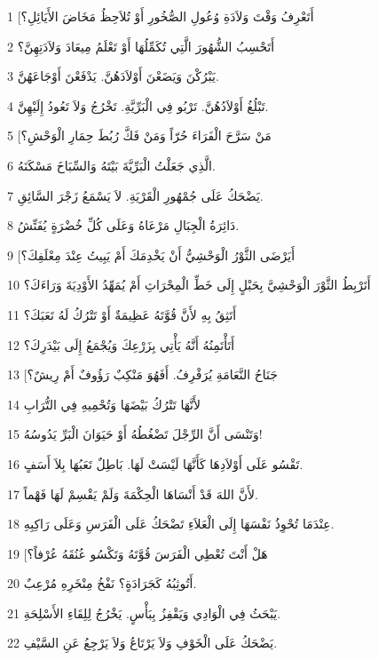 \par 1 [أَتَعْرِفُ وَقْتَ وَلاَدَةِ وُعُولِ الصُّخُورِ أَوْ تُلاَحِظُ مَخَاضَ الأَيَائِلِ؟
\par 2 أَتَحْسِبُ الشُّهُورَ الَّتِي تُكَمِّلُهَا أَوْ تَعْلَمُ مِيعَادَ وَلاَدَتِهِنَّ؟
\par 3 يَبْرُكْنَ وَيَضَعْنَ أَوْلاَدَهُنَّ. يَدْفَعْنَ أَوْجَاعَهُنَّ.
\par 4 تَبْلُغُ أَوْلاَدُهُنَّ. تَرْبُو فِي الْبَرِّيَّةِ. تَخْرُجُ وَلاَ تَعُودُ إِلَيْهِنَّ.
\par 5 [مَنْ سَرَّحَ الْفَرَاءَ حُرّاً وَمَنْ فَكَّ رُبُطَ حِمَارِ الْوَحْشِ؟
\par 6 الَّذِي جَعَلْتُ الْبَرِّيَّةَ بَيْتَهُ وَالسِّبَاخَ مَسْكَنَهُ.
\par 7 يَضْحَكُ عَلَى جُمْهُورِ الْقَرْيَةِ. لاَ يَسْمَعُ زَجْرَ السَّائِقِ.
\par 8 دَائِرَةُ الْجِبَالِ مَرْعَاهُ وَعَلَى كُلِّ خُضْرَةٍ يُفَتِّشُ.
\par 9 [أَيَرْضَى الثَّوْرُ الْوَحْشِيُّ أَنْ يَخْدِمَكَ أَمْ يَبِيتُ عِنْدَ مِعْلَفِكَ؟
\par 10 أَتَرْبِطُ الثَّوْرَ الْوَحْشِيَّ بِحَبْلٍ إِلَى خَطِّ الْمِحْرَاثِ أَمْ يُمَهِّدُ الأَوْدِيَةَ وَرَاءَكَ؟
\par 11 أَتَثِقُ بِهِ لأَنَّ قُوَّتَهُ عَظِيمَةٌ أَوْ تَتْرُكُ لَهُ تَعَبَكَ؟
\par 12 أَتَأْتَمِنُهُ أَنَّهُ يَأْتِي بِزَرْعِكَ وَيُجْمَعُ إِلَى بَيْدَرِكَ؟
\par 13 [جَنَاحُ النَّعَامَةِ يُرَفْرِفُ. أَفَهُوَ مَنْكِبٌ رَؤُوفٌ أَمْ رِيشٌ؟
\par 14 لأَنَّهَا تَتْرُكُ بَيْضَهَا وَتُحْمِيهِ فِي التُّرَابِ
\par 15 وَتَنْسَى أَنَّ الرِّجْلَ تَضْغُطُهُ أَوْ حَيَوَانَ الْبَرِّ يَدُوسُهُ!
\par 16 تَقْسُو عَلَى أَوْلاَدِهَا كَأَنَّهَا لَيْسَتْ لَهَا. بَاطِلٌ تَعَبُهَا بِلاَ أَسَفٍ.
\par 17 لأَنَّ اللهَ قَدْ أَنْسَاهَا الْحِكْمَةَ وَلَمْ يَقْسِمْ لَهَا فَهْماً.
\par 18 عِنْدَمَا تُحْوِذُ نَفْسَهَا إِلَى الْعَلاَءِ تَضْحَكُ عَلَى الْفَرَسِ وَعَلَى رَاكِبِهِ.
\par 19 [هَلْ أَنْتَ تُعْطِي الْفَرَسَ قُوَّتَهُ وَتَكْسُو عُنُقَهُ عُرْفاً؟
\par 20 أَتُوثِبُهُ كَجَرَادَةٍ؟ نَفْخُ مِنْخَرِهِ مُرْعِبٌ.
\par 21 يَبْحَثُ فِي الْوَادِي وَيَقْفِزُ بِبَأْسٍ. يَخْرُجُ لِلِقَاءِ الأَسْلِحَةِ.
\par 22 يَضْحَكُ عَلَى الْخَوْفِ وَلاَ يَرْتَاعُ وَلاَ يَرْجِعُ عَنِ السَّيْفِ.
